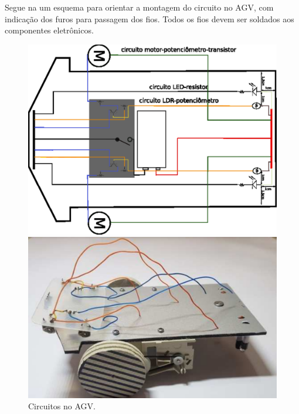 \documentclass{textolivre-html}
\begin{document}
Segue na  um esquema para orientar a montagem do circuito no AGV, com
indicação dos furos para passagem dos fios. Todos os fios devem ser soldados
aos componentes eletrônicos.

\begin{figure}[H]
\begin{minipage}{0.47\textwidth}
\includegraphics[width=\linewidth]{figure-22.pdf}
\subcaption{}
\end{minipage}
\hfill
\begin{minipage}{0.47\textwidth} 
\includegraphics[width=\linewidth]{figure-23.pdf}
\subcaption{}
\end{minipage}
\caption{Circuitos no AGV.}
\label{fig16}
\end{figure}
\end{document}
